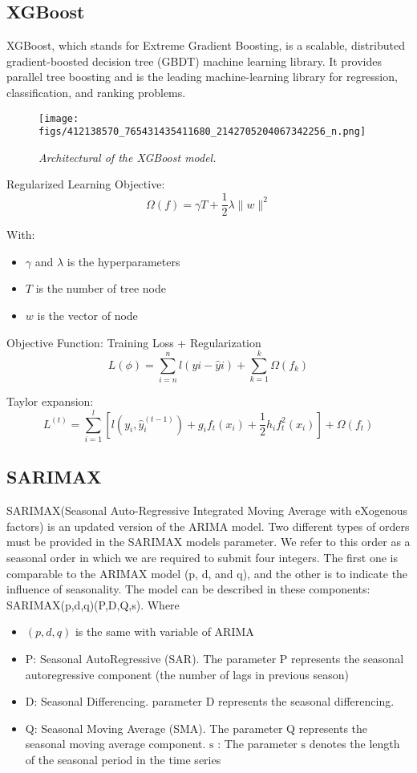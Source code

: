 \documentclass{ieeeojies}
\begin{document}
\subsection{XGBoost}
\hspace{0.3cm}XGBoost, which stands for Extreme Gradient Boosting, is a scalable, distributed gradient-boosted decision tree (GBDT) machine learning library. It provides parallel tree boosting and is the leading machine-learning library for regression, classification, and ranking problems\cite{nvidiaWhatXGBoost}.

\begin{figure}[H]
    \centering
    \texttt{[image: figs/412138570\_765431435411680\_2142705204067342256\_n.png]}
    \caption{\centering \textit{Architectural of the XGBoost model.}}
    \label{fig:enter-label}
\end{figure}
Regularized Learning Objective\cite{geeksforgeeksXGBoostGeeksforGeeks}:
$$
\Omega(f)=\gamma T+\frac{1}{2} \lambda\|w\|^2
$$

With:
\begin{itemize}
    \item $\gamma$ and $\lambda$ is the hyperparameters
    \item $T$ is the number of tree node
    \item $w$ is the vector of node
\end{itemize}
Objective Function: Training Loss + Regularization
$$
L(\phi)=\sum_{i=n}^n l(y i-\hat{y} i)+\sum_{k=1}^k \Omega\left(f_k\right)
$$

Taylor expansion:
$$
L^{(t)}=\sum_{i=1}^l\left[l\left(y_i, \hat{y}_i^{(t-1)}\right)+g_i f_t\left(x_i\right)+\frac{1}{2} h_i f_t^2\left(x_i\right)\right]+\Omega\left(f_t\right)
$$

\subsection{SARIMAX}
\hspace{0.3cm}SARIMAX(Seasonal Auto-Regressive Integrated Moving Average with eXogenous factors) is an updated version of the ARIMA model\cite{article6}. 
Two different types of orders must be provided in the SARIMAX models parameter. We refer to this order as a seasonal order in which we are required to submit four integers. The first one is comparable to the ARIMAX model (p, d, and q), and the other is to indicate the influence of seasonality. The model can be described in these components: SARIMAX(p,d,q)(P,D,Q,s).
Where
\begin{itemize}
    \item $(p, d, q)$ is the same with variable of ARIMA
    \item P: Seasonal AutoRegressive (SAR). The parameter P represents the seasonal autoregressive component (the number of lags in previous season)
    \item D: Seasonal Differencing. parameter D represents the seasonal differencing.
    \item Q: Seasonal Moving Average (SMA). The parameter Q represents the seasonal moving average component. $\mathrm{s}$ : The parameter $\mathrm{s}$ denotes the length of the seasonal period in the time series
\end{itemize}
\end{document}
